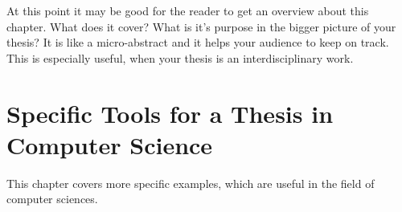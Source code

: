 \documentclass[pdftex,11pt,titlepage,twoside,openright]{report}
\begin{document}
At this point it may be good for the reader to get an overview about this chapter. What does it cover? What is it's purpose in the bigger picture of your thesis? It is like a micro-abstract and it helps your audience to keep on track. This is especially useful, when your thesis is an interdisciplinary work.



\newpage




%
%
\cleardoublepage
\chapter{Specific Tools for a Thesis in Computer Science}

This chapter covers more specific examples, which are useful in the field of computer sciences.

\newpage


%
%

\cleardoublepage
{} %
\pagestyle{plain}





\end{document}
